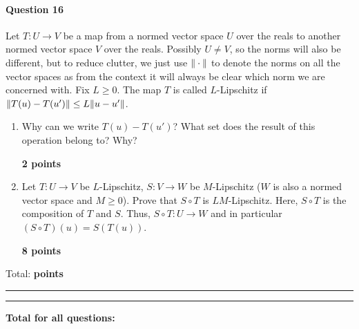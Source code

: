 \documentclass{article}
\DeclareMathOperator*{\1}{\mathbbm{1}}
\newcounter{DocPoints}
\newcounter{QuestionPoints}
\newcommand{\points}[1]{	\par\mbox{}\par\noindent\hfill {\bf #1 points}	\addtocounter{DocPoints}{#1}
	\addtocounter{QuestionPoints}{#1}
}
\newcommand{\tpoints}[1]{        	\ifthenelse{\isempty{#1}}	{	}	{		\addtocounter{DocPoints}{#1}
		\addtocounter{QuestionPoints}{#1}
	}													 	\par\mbox{}\par\noindent\hfill {Total: \bf \arabic{QuestionPoints}\xspace points}\par\mbox{}\par\hrule\hrule
	\setcounter{QuestionPoints}{0}
}
\begin{document}
\paragraph{Question 16}
Let $T:U\to V$ be a map from a normed vector space $U$ over the reals to another normed vector space $V$ over the reals. Possibly $U\ne V$, so the norms will also be different, but to reduce clutter, we just use $\|\cdot\|$ to denote the norms on all the vector spaces as from the context it will always be clear which norm we are concerned with.
Fix $L\ge 0$. The map $T$ is called $L$-Lipschitz if $\|T(u)-T(u')\|\le L \|u-u'\|$. 
\begin{enumerate}
\item Why can we write $T(u)-T(u')$? What set does the result of this operation belong to? Why?
\points{2}
\item Let $T:U\to V$ be $L$-Lipschitz, $S:V \to W$ be $M$-Lipschitz ($W$ is also a normed vector space and $M\ge 0$).
Prove that $S \circ T$ is $LM$-Lipschitz. Here, $S\circ T$ is the composition of $T$ and $S$. Thus, $S\circ T: U \to W$ and in particular $(S\circ T)(u) = S(T(u))$.
\points{8}
\end{enumerate}
\tpoints{}




\bigskip
\bigskip

\noindent
\textbf{
Total for all questions: }
\end{document}

